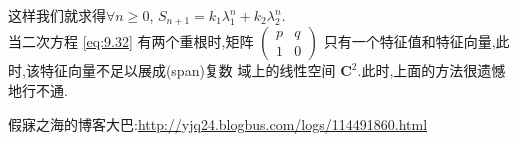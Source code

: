 \documentclass[a4paper]{article}
\begin{document}
这样我们就求得$\forall n\geq 0$, $S_{n+1}=k_1\lambda_1^n+k_2\lambda_2^n$.\\
\newpage
当二次方程 \eqref{eq:9.32} 有两个重根时,矩阵 $\begin{pmatrix}
  p&q\\
1&0
\end{pmatrix}$ 只有一个特征值和特征向量,此时,该特征向量不足以展成(span)复数
域上的线性空间 $\mathbf{C}^2$.此时,上面的方法很遗憾地行不通.
\begin{thebibliography}{}
假寐之海的博客大巴:\href{http://yjq24.blogbus.com/logs/114491860.html}{http://yjq24.blogbus.com/logs/114491860.html}
\end{thebibliography}
\end{document}
